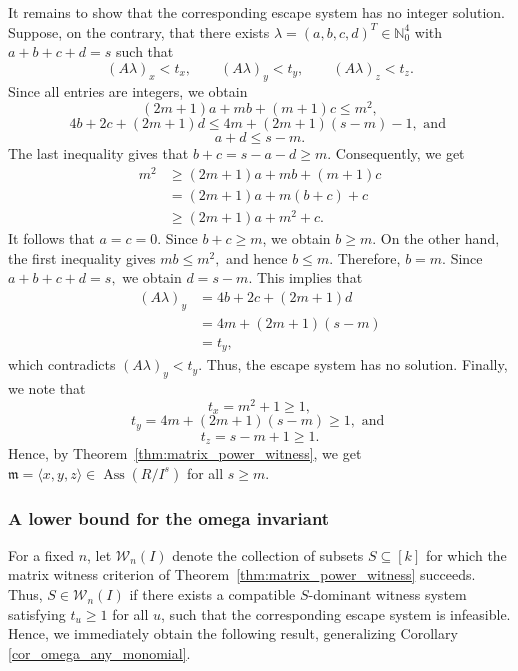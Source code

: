 \documentclass[11pt]{amsart}   %
\begin{document}
\begin{exm}
It remains to show that the corresponding escape system has no integer
solution. Suppose, on the contrary, that there exists $\lambda=(a,b,c,d)^T\in\mathbb{N}_0^4$
with $a+b+c+d=s$  such that
\[
(A\lambda)_x<t_x,\qquad
(A\lambda)_y<t_y,\qquad
(A\lambda)_z<t_z.
\]
Since all entries are integers, we obtain
\[
(2m+1)a+mb+(m+1)c\leq m^2,
\]
\[
4b+2c+(2m+1)d
\leq
4m+(2m+1)(s-m)-1, \text{ and }
\]
\[
a+d\leq s-m.
\]
The last inequality gives that $b+c=s-a-d\geq m.$ Consequently, we get
\[
\begin{aligned}
m^2
&\geq (2m+1)a+mb+(m+1)c\\
&=(2m+1)a+m(b+c)+c\\
&\geq (2m+1)a+m^2+c.
\end{aligned}
\]
It follows that  $a=c=0.$  Since $b+c\geq m$, we obtain $b\geq m.$ On the other hand, the first inequality gives
 $mb\leq m^2,$ and hence $b\leq m.$ Therefore, $b=m.$ Since $a+b+c+d=s,$ we obtain $d=s-m.$ This implies that
\[
\begin{aligned}
(A\lambda)_y
&=4b+2c+(2m+1)d\\
&=4m+(2m+1)(s-m)\\
&=t_y,
\end{aligned}
\]
which contradicts $(A\lambda)_y<t_y.$ Thus, the escape system has no solution.
Finally, we note that
\[
t_x=m^2+1\geq1,
\]
\[
t_y=4m+(2m+1)(s-m)\geq1, \text{  and  }
\]
\[
t_z=s-m+1\geq1.
\]
Hence, by Theorem~\ref{thm:matrix_power_witness}, we get $\mathfrak{m}=\langle x,y,z\rangle\in\operatorname{Ass}(R/I^s)$
for all $s\geq m$.
\end{exm}


\subsubsection{A lower bound for the omega invariant}
\label{sec_power_lower_bound}

For a fixed $n$, let $\mathcal W_n(I)$ denote the collection of subsets
$S\subseteq[k]$ for which the matrix witness criterion of
Theorem~\ref{thm:matrix_power_witness} succeeds. Thus, $S\in\mathcal W_n(I)$
if there exists a compatible $S$-dominant witness system satisfying
$t_u\geq1$ for all $u$, such that the corresponding escape system is
infeasible. Hence,  we immediately obtain the following result, generalizing Corollary \ref{cor_omega_any_monomial}.
\end{document}
